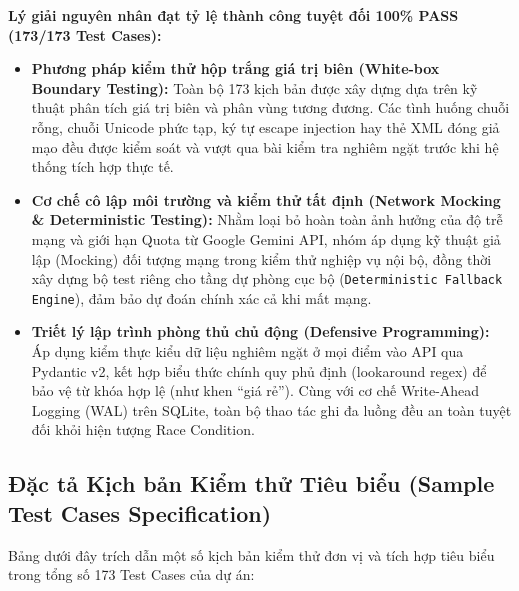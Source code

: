 \documentclass[12pt, a4paper]{article}
\begin{document}
\textbf{Lý giải nguyên nhân đạt tỷ lệ thành công tuyệt đối 100\% PASS (173/173 Test Cases):}
\begin{itemize}[leftmargin=0.8cm, itemsep=2pt, parsep=0pt, topsep=2pt]
    \item \textbf{Phương pháp kiểm thử hộp trắng giá trị biên (White-box Boundary Testing):} Toàn bộ 173 kịch bản được xây dựng dựa trên kỹ thuật phân tích giá trị biên và phân vùng tương đương. Các tình huống chuỗi rỗng, chuỗi Unicode phức tạp, ký tự escape injection hay thẻ XML đóng giả mạo đều được kiểm soát và vượt qua bài kiểm tra nghiêm ngặt trước khi hệ thống tích hợp thực tế.
    \item \textbf{Cơ chế cô lập môi trường và kiểm thử tất định (Network Mocking \& Deterministic Testing):} Nhằm loại bỏ hoàn toàn ảnh hưởng của độ trễ mạng và giới hạn Quota từ Google Gemini API, nhóm áp dụng kỹ thuật giả lập (Mocking) đối tượng mạng trong kiểm thử nghiệp vụ nội bộ, đồng thời xây dựng bộ test riêng cho tầng dự phòng cục bộ (\texttt{Deterministic Fallback Engine}), đảm bảo dự đoán chính xác cả khi mất mạng.
    \item \textbf{Triết lý lập trình phòng thủ chủ động (Defensive Programming):} Áp dụng kiểm thực kiểu dữ liệu nghiêm ngặt ở mọi điểm vào API qua Pydantic v2, kết hợp biểu thức chính quy phủ định (lookaround regex) để bảo vệ từ khóa hợp lệ (như khen ``giá rẻ''). Cùng với cơ chế Write-Ahead Logging (WAL) trên SQLite, toàn bộ thao tác ghi đa luồng đều an toàn tuyệt đối khỏi hiện tượng Race Condition.
\end{itemize}

\newpage
\subsection{Đặc tả Kịch bản Kiểm thử Tiêu biểu (Sample Test Cases Specification)}
Bảng dưới đây trích dẫn một số kịch bản kiểm thử đơn vị và tích hợp tiêu biểu trong tổng số 173 Test Cases của dự án:
\end{document}
